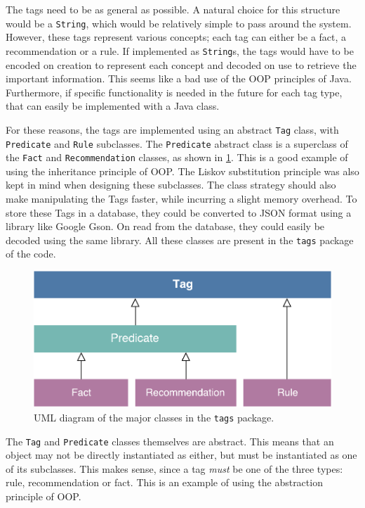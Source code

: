 \documentclass[titlepage,11pt]{article}
\newcommand{\code}[1]{\texttt{#1}}
\begin{document}
The tags need to be as general as possible. A natural choice for this structure would be a \code{String}, which would be relatively simple to pass around the system. However, these tags represent various concepts; each tag can either be a fact, a recommendation or a rule. If implemented as \code{String}s, the tags would have to be encoded on creation to represent each concept and decoded on use to retrieve the important information. This seems like a bad use of the OOP principles of Java. Furthermore, if specific functionality is needed in the future for each tag type, that can easily be implemented with a Java class.

For these reasons, the tags are implemented using an abstract \code{Tag} class, with \code{Predicate} and \code{Rule} subclasses. The \code{Predicate} abstract class is a superclass of the \code{Fact} and \code{Recommendation} classes, as shown in \cref{fig:uml_tags}. This is a good example of using the inheritance principle of OOP. The Liskov substitution principle was also kept in mind when designing these subclasses. The class strategy should also make manipulating the Tags faster, while incurring a slight memory overhead. To store these Tags in a database, they could be converted to JSON format using a library like Google Gson. On read from the database, they could easily be decoded using the same library. All these classes are present in the \code{tags} package of the code.

\begin{figure}[!htb]
	\includegraphics[width=\columnwidth]{figures/uml_tags.pdf}
	\caption{UML diagram of the major classes in the \code{tags} package.}
	\label{fig:uml_tags}
\end{figure}

The \code{Tag} and \code{Predicate} classes themselves are abstract. This means that an object may not be directly instantiated as either, but must be instantiated as one of its subclasses. This makes sense, since a tag \emph{must} be one of the three types: rule, recommendation or fact. This is an example of using the abstraction principle of OOP.
\end{document}
